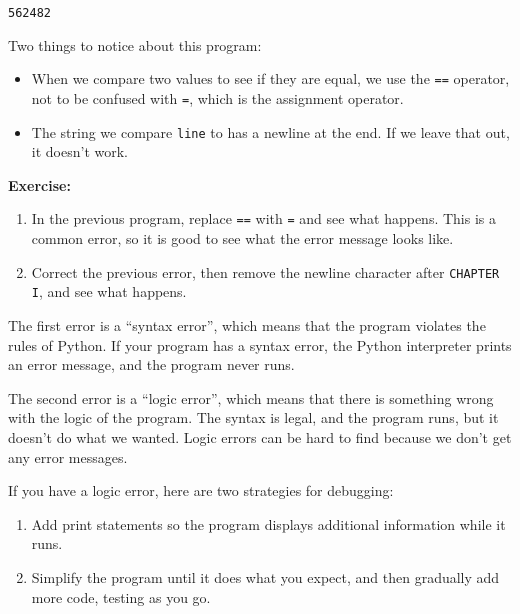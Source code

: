 \begin{lstlisting}[style=output]
562482
\end{lstlisting}

Two things to notice about this program:

\begin{itemize}
\item
  When we compare two values to see if they are equal, we use the
  \passthrough{\lstinline!==!} operator, not to be confused with
  \passthrough{\lstinline!=!}, which is the assignment operator.
\item
  The string we compare \passthrough{\lstinline!line!} to has a newline
  at the end. If we leave that out, it doesn't work.
\end{itemize}

\textbf{Exercise:}

\begin{enumerate}
\def\labelenumi{\arabic{enumi}.}
\item
  In the previous program, replace \passthrough{\lstinline!==!} with
  \passthrough{\lstinline!=!} and see what happens. This is a common
  error, so it is good to see what the error message looks like.
\item
  Correct the previous error, then remove the newline character after
  \passthrough{\lstinline!CHAPTER I!}, and see what happens.
\end{enumerate}

The first error is a ``syntax error'', which means that the program
violates the rules of Python. If your program has a syntax error, the
Python interpreter prints an error message, and the program never runs.

The second error is a ``logic error'', which means that there is
something wrong with the logic of the program. The syntax is legal, and
the program runs, but it doesn't do what we wanted. Logic errors can be
hard to find because we don't get any error messages.

If you have a logic error, here are two strategies for debugging:

\begin{enumerate}
\def\labelenumi{\arabic{enumi}.}
\item
  Add print statements so the program displays additional information
  while it runs.
\item
  Simplify the program until it does what you expect, and then gradually
  add more code, testing as you go.
\end{enumerate}

